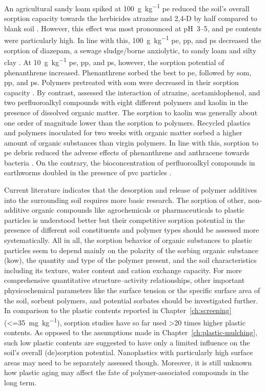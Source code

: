 An agricultural sandy loam spiked at \SI{100}{\gram\per\kilo\gram} \ac{pe} reduced the soil's overall sorption capacity towards the herbicides atrazine and 2,4-D by half compared to blank soil \citep{HufferPolyethylene2019}. However, this effect was most pronounced at pH~\numrange{3}{5}, and \ac{pe} contents were particularly high. In line with this, \SI{100}{\gram\per\kilo\gram} \ac{pe}, \ac{pp}, and \ac{ps} decreased the sorption of diazepam, a sewage sludge\-/borne anxiolytic, to sandy loam and silty clay \citep{XuContrasting2021}. At \SI{10}{\gram\per\kilo\gram} \ac{pe}, \ac{pp}, and \ac{ps}, however, the sorption potential of phenanthrene increased. Phenanthrene sorbed the best to \ac{pe}, followed by \ac{som}, \ac{pp}, and \ac{ps}. Polymers pretreated with \ac{som} were decreased in their sorption capacity \citep{XuContrasting2021}.
By contrast, \citet{AteiaSorption2020} assessed the interaction of atrazine, acetamidophenol, and two perfluoroalkyl compounds with eight different polymers and kaolin in the presence of dissolved organic matter. The sorption to kaolin was generally about one order of magnitude lower than the sorption to polymers. Recycled plastics and polymers inoculated for two weeks with organic matter sorbed a higher amount of organic substances than virgin polymers.
In line with this, sorption to \ac{pe} debris reduced the adverse effects of phenanthrene and anthracene towards bacteria \citep{KleinteichMicroplastics2018}. On the contrary, the bioconcentration of perfluoroalkyl compounds in earthworms doubled in the presence of \ac{pvc} particles \citep{SobhaniMicroplastics2021}.

Current literature indicates that the desorption and release of polymer additives into the surrounding soil requires more basic research. The sorption of other, non-additive organic compounds like agrochemicals or pharmaceuticals to plastic particles is understood better but their competitive sorption potential in the presence of different soil constituents and polymer types should be assessed more systematically. All in all, the sorption behavior of organic substances to plastic particles seem to depend mainly on the polarity of the sorbing organic substance (\ac{kow}), the quantity and type of the polymer present, and the soil characteristics including its texture, water content and cation exchange capacity. For more comprehensive quantitative structure--activity relationships, other important physicochemical parameters like the surface tension or the specific surface area of the soil, sorbent polymers, and potential sorbates should be investigated further.
In comparison to the plastic contents reported in Chapter~\ref{ch:screening} (\SI{<=35}{\milli\gram\per\kilo\gram}), sorption studies have so far used \num{>20} times higher plastic contents. As opposed to the assumptions made in Chapter~\ref{ch:plastic-mulching}, such low plastic contents are suggested to have only a limited influence on the soil's overall (de)sorption potential. Nanoplastics with particularly high surface areas may need to be separately assessed though. Moreover, it is still unknown how plastic aging may affect the fate of polymer-associated compounds in the long term.

